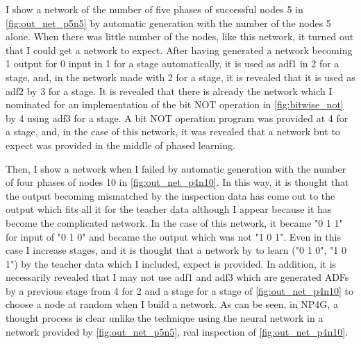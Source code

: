 \documentclass{article}
\begin{document}
I show a network of the number of five phases of successful nodes 5 in \ref{fig:out_net_p5n5} by automatic generation with the number of the nodes 5 alone.
When there was little number of the nodes, like this network, it turned out that I could get a network to expect.
After having generated a network becoming 1 output for 0 input in 1 for a stage automatically, it is used as adf1 in 2 for a stage, and, in the network made with 2 for a stage, it is revealed that it is used as adf2 by 3 for a stage.
It is revealed that there is already the network which I nominated for an implementation of the bit NOT operation in \ref{fig:bitwise_not} by 4 using adf3 for a stage.
A bit NOT operation program was provided at 4 for a stage, and, in the case of this network, it was revealed that a network but to expect was provided in the middle of phased learning.

Then, I show a network when I failed by automatic generation with the number of four phases of nodes 10 in \ref{fig:out_net_p4n10}.
In this way, it is thought that the output becoming mismatched by the inspection data has come out to the output which fits all it for the teacher data although I appear because it has become the complicated network.
In the case of this network, it became "0 1 1" for input of "0 1 0" and became the output which was not "1 0 1".
Even in this case I increase stages, and it is thought that a network by to learn ("0 1 0", "1 0 1") by the teacher data which I included, expect is provided.
In addition, it is necessarily revealed that I may not use adf1 and adf3 which are generated ADFs by a previous stage from 4 for 2 and a stage for a stage of \ref{fig:out_net_p4n10} to choose a node at random when I build a network.
As can be seen, in NP4G, a thought process is clear unlike the technique using the neural network in a network provided by \ref{fig:out_net_p5n5}, real inspection of \ref{fig:out_net_p4n10}.
\end{document}
